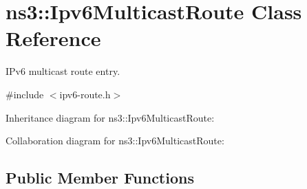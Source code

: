 \hypertarget{classns3_1_1Ipv6MulticastRoute}{}\section{ns3\+:\+:Ipv6\+Multicast\+Route Class Reference}
\label{classns3_1_1Ipv6MulticastRoute}


I\+Pv6 multicast route entry.  




{\ttfamily \#include $<$ipv6-\/route.\+h$>$}



Inheritance diagram for ns3\+:\+:Ipv6\+Multicast\+Route\+:


Collaboration diagram for ns3\+:\+:Ipv6\+Multicast\+Route\+:
\subsection*{Public Member Functions}
